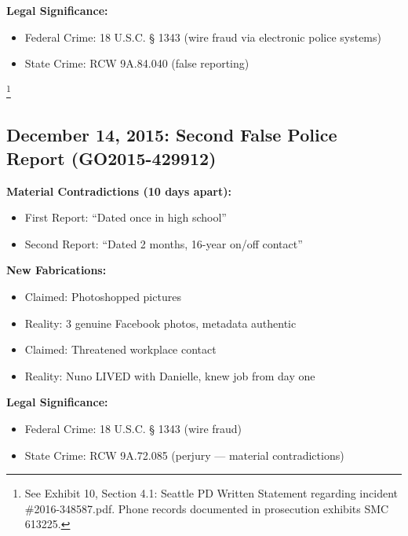 \documentclass[12pt,oneside]{article}
\begin{document}
\textbf{Legal Significance:}

\begin{itemize}

\item Federal Crime: 18 U.S.C. § 1343 (wire fraud via electronic police systems)

\item State Crime: RCW 9A.84.040 (false reporting)

\end{itemize}

\footnote{See Exhibit 10, Section 4.1: Seattle PD Written Statement regarding incident \#2016-348587.pdf. Phone records documented in prosecution exhibits SMC 613225.}

\subsection*{December 14, 2015: Second False Police Report (GO2015-429912)}

\textbf{Material Contradictions (10 days apart):}

\begin{itemize}

\item First Report: ``Dated once in high school''

\item Second Report: ``Dated 2 months, 16-year on/off contact''

\end{itemize}

\textbf{New Fabrications:}

\begin{itemize}

\item Claimed: Photoshopped pictures

\item Reality: 3 genuine Facebook photos, metadata authentic

\item Claimed: Threatened workplace contact

\item Reality: Nuno LIVED with Danielle, knew job from day one

\end{itemize}

\textbf{Legal Significance:}

\begin{itemize}

\item Federal Crime: 18 U.S.C. § 1343 (wire fraud)

\item State Crime: RCW 9A.72.085 (perjury --- material contradictions)

\end{itemize}
\end{document}
